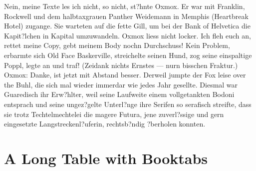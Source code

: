 Nein, meine Texte les ich nicht, so nicht, st?hnte Oxmox. Er war mit Franklin, Rockwell und dem halbtaxgrauen Panther Weidemann in Memphis (Heartbreak Hotel) zugange. Sie warteten auf die fette Gill, um bei der Bank of Helvetica die Kapit?lchen in Kapital umzuwandeln. Oxmox liess nicht locker. Ich fleh euch an, rettet meine Copy, gebt meinem Body nochn Durchschuss! Kein Problem, erbarmte sich Old Face Baskerville, streichelte seinen Hund, zog seine einspaltige Poppl, legte an und traf! (Zeidank nichts Ernstes --- nurn bisschen Fraktur.) Oxmox: Danke, ist jetzt mit Abstand besser. Derweil jumpte der Fox leise over the Buhl, die sich mal wieder immerdar wie jedes Jahr gesellte. Diesmal war Guaredisch ihr Erw?hlter, weil seine Laufweite einem vollgetankten Bodoni entsprach und seine ungez?gelte Unterl?nge ihre Serifen so serafisch streifte, dass sie trotz Techtelmechtelei die magere Futura, jene zuverl?ssige und gern eingesetzte Langstreckenl?uferin, rechtsb?ndig ?berholen konnten.


\section{A Long Table with Booktabs}



